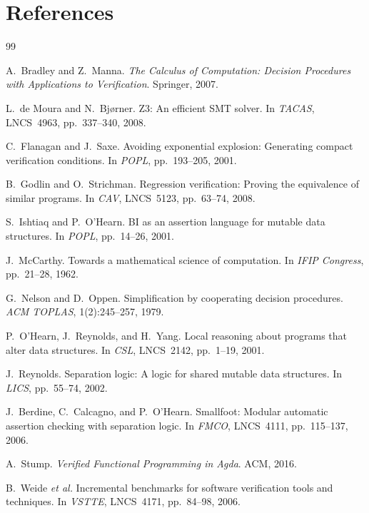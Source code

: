 \documentclass[11pt]{article}
\begin{document}
\section*{References}

\begin{thebibliography}{99}

A.~Bradley and Z.~Manna.
\newblock \emph{The Calculus of Computation: Decision Procedures with
  Applications to Verification}.
\newblock Springer, 2007.

L.~de Moura and N.~Bj{\o}rner.
\newblock Z3: An efficient SMT solver.
\newblock In \emph{TACAS}, LNCS~4963, pp.~337--340, 2008.

C.~Flanagan and J.~Saxe.
\newblock Avoiding exponential explosion: Generating compact verification
  conditions.
\newblock In \emph{POPL}, pp.~193--205, 2001.

B.~Godlin and O.~Strichman.
\newblock Regression verification: Proving the equivalence of similar programs.
\newblock In \emph{CAV}, LNCS~5123, pp.~63--74, 2008.

S.~Ishtiaq and P.~O'Hearn.
\newblock BI as an assertion language for mutable data structures.
\newblock In \emph{POPL}, pp.~14--26, 2001.

J.~McCarthy.
\newblock Towards a mathematical science of computation.
\newblock In \emph{IFIP Congress}, pp.~21--28, 1962.

G.~Nelson and D.~Oppen.
\newblock Simplification by cooperating decision procedures.
\newblock \emph{ACM TOPLAS}, 1(2):245--257, 1979.

P.~O'Hearn, J.~Reynolds, and H.~Yang.
\newblock Local reasoning about programs that alter data structures.
\newblock In \emph{CSL}, LNCS~2142, pp.~1--19, 2001.

J.~Reynolds.
\newblock Separation logic: A logic for shared mutable data structures.
\newblock In \emph{LICS}, pp.~55--74, 2002.

J.~Berdine, C.~Calcagno, and P.~O'Hearn.
\newblock Smallfoot: Modular automatic assertion checking with separation logic.
\newblock In \emph{FMCO}, LNCS~4111, pp.~115--137, 2006.

A.~Stump.
\newblock \emph{Verified Functional Programming in Agda}.
\newblock ACM, 2016.

B.~Weide \emph{et al.}
\newblock Incremental benchmarks for software verification tools and
  techniques.
\newblock In \emph{VSTTE}, LNCS~4171, pp.~84--98, 2006.

\end{thebibliography}
\end{document}

